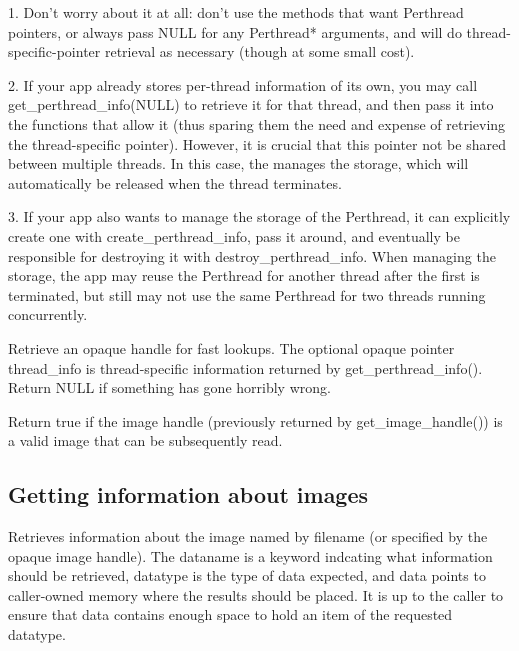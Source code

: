 1. Don't worry about it at all: don't use the methods that want {\cf
Perthread} pointers, or always pass {\cf NULL} for any {\cf Perthread*}
arguments, and \ImageCache will do thread-specific-pointer retrieval as
necessary (though at some small cost).

2. If your app already stores per-thread information of its own, you may
call {\cf get_perthread_info(NULL)} to retrieve it for that thread, and then
pass it into the functions that allow it (thus sparing them the need and
expense of retrieving the thread-specific pointer). However, it is crucial
that this pointer not be shared between multiple threads. In this case,
the \ImageCache manages the storage, which will automatically be released
when the thread terminates.

3. If your app also wants to manage the storage of the {\cf Perthread},
it can explicitly create one with {\cf create_perthread_info}, pass it around,
and eventually be responsible for destroying it with {\cf destroy_perthread_info}.
When managing the storage, the app may reuse the {\cf Perthread} for another
thread after the first is terminated, but still may not use the same
{\cf Perthread} for two threads running concurrently.
\apiend


Retrieve an opaque handle for fast \ImageCache lookups.  The optional opaque
pointer {\cf thread_info} is thread-specific information returned by
{\cf get_perthread_info()}.  Return {\cf NULL} if something has gone
horribly wrong.
\apiend

Return true if the image handle (previously returned by
{\cf get_image_handle()}) is a valid image that can be subsequently read.
\apiend


\subsection{Getting information about images}
\label{sec:imagecache:api:getimageinfo}
\label{sec:imagecache:api:getimagespec}


Retrieves information about the image named by {\cf filename} (or specified
by the opaque image handle).
The {\cf dataname} is a keyword indcating what information should
be retrieved, {\cf datatype} is the type of data expected, and
{\cf data} points to caller-owned memory where the results should be
placed.  It is up to the caller to ensure that {\cf data} contains
enough space to hold an item of the requested {\cf datatype}.

